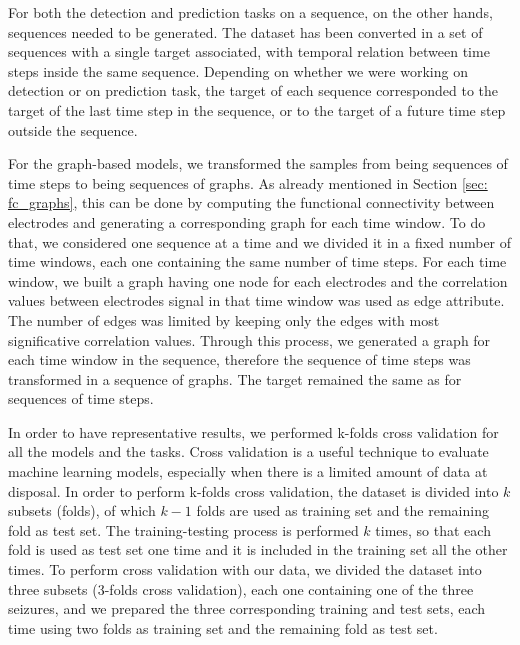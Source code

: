 For both the detection and prediction tasks on a sequence, on the other hands, sequences needed to be generated. The dataset has been converted in a set of sequences with a single target associated, with temporal relation between time steps inside the same sequence. Depending on whether we were working on detection or on prediction task, the target of each sequence corresponded to the target of the last time step in the sequence, or to the target of a future time step outside the sequence.

For the graph-based models, we transformed the samples from being sequences of time steps to being sequences of graphs. As already mentioned in Section \ref{sec: fc_graphs}, this can be done by computing the functional connectivity between electrodes and generating a corresponding graph for each time window. To do that, we considered one sequence at a time and we divided it in a fixed number of time windows, each one containing the same number of time steps. For each time window, we built a graph having one node for each electrodes and the correlation values between electrodes signal in that time window was used as edge attribute. The number of edges was limited by keeping only the edges with most significative correlation values. Through this process, we generated a graph for each time window in the sequence, therefore the sequence of time steps was transformed in a sequence of graphs. The target remained the same as for sequences of time steps.

In order to have representative results, we performed k-folds cross validation for all the models and the tasks. Cross validation is a useful technique to evaluate machine learning models, especially when there is a limited amount of data at disposal. In order to perform k-folds cross validation, the dataset is divided into $k$ subsets (folds), of which $k-1$ folds are used as training set and the remaining fold as test set. The training-testing process is performed $k$ times, so that each fold is used as test set one time and it is included in the training set all the other times. To perform cross validation with our data, we divided the dataset into three subsets (3-folds cross validation), each one containing one of the three seizures, and we prepared the three corresponding training and test sets, each time using two folds as training set and the remaining fold as test set.


